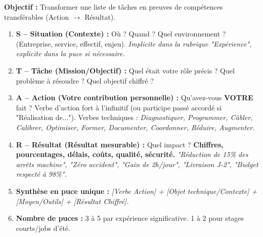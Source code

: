 \documentclass[11pt]{article}
\newcommand{\cle}[1]{{\popxbold\color{popdark}#1}}
\begin{document}
\begin{methode}
\textbf{Objectif :} Transformer une liste de tâches en preuves de compétences transférables (Action $\rightarrow$ Résultat).
\begin{enumerate}
    \item \textbf{S -- Situation (Contexte) :} Où ? Quand ? Quel environnement ? (Entreprise, service, effectif, enjeu). \emph{Implicite dans la rubrique "Expérience", explicite dans la puce si nécessaire.}
    \item \textbf{T -- Tâche (Mission/Objectif) :} Quel était votre rôle précis ? Quel problème à résoudre ? Quel objectif chiffré ?
    \item \textbf{A -- Action (Votre contribution personnelle) :} Qu'avez-vous \textbf{VOTRE} fait ? Verbe d'action fort à l'infinitif (ou participe passé accordé si "Réalisation de..."). \cle{Verbes techniques :} \emph{Diagnostiquer, Programmer, Câbler, Calibrer, Optimiser, Former, Documenter, Coordonner, Réduire, Augmenter.}
    \item \textbf{R -- Résultat (Résultat mesurable) :} Quel impact ? \textbf{Chiffres, pourcentages, délais, coûts, qualité, sécurité.} \emph{"Réduction de 15\% des arrêts machine", "Zéro accident", "Gain de 2h/jour", "Livraison J-2", "Budget respecté à 98\%".}
    \item \textbf{Synthèse en puce unique :} \emph{[Verbe Action] + [Objet technique/Contexte] + [Moyen/Outils] + [Résultat Chiffré].}
    \item \textbf{Nombre de puces :} 3 à 5 par expérience significative. 1 à 2 pour stages courts/jobs d'été.
\end{enumerate}
\end{methode}
\end{document}
